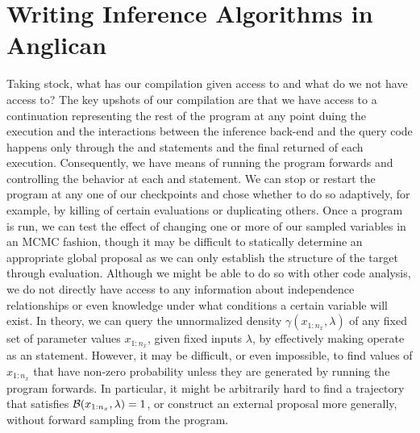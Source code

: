 
\section{Writing Inference Algorithms in Anglican}
\label{sec:proginf:inf}

Taking stock, what has our compilation
given access to and what do we not have access to?  The key upshots of our compilation are
that we have access to a continuation representing the rest of the program at any point
duing the execution and 
the interactions between the inference back-end and the query code happens only through
the \sample and \observe statements and the final returned \angstate of each execution.
Consequently, we have means of running the program
forwards and controlling the behavior at each \sample and \observe statement.  We can
stop or restart the program at any one of our checkpoints and chose whether to do so
adaptively, for example, by killing of certain evaluations or duplicating others.  Once
a program is run, we can test the effect of changing one or more of our sampled variables
in an MCMC fashion, though it may be difficult to statically determine an appropriate global proposal
as we can only establish the structure of the target through evaluation.  Although we might be
able to do so with other code analysis, we do not directly have access to any information
about independence relationships or even knowledge under what conditions a certain
variable will exist.  
In theory, we can query the unnormalized density $\gamma(x_{1:n_x},\lambda)$ of any fixed set of 
parameter values $x_{1:n_x}$, given fixed inputs $\lambda$, by effectively making
\sample operate as an \observe statement.  However, it may be difficult, or even impossible, to find
values of $x_{1:n_x}$ that have non-zero probability unless they are generated by running
the program forwards.  In particular, it might be arbitrarily hard to find a trajectory that satisfies
$\mathcal{B}(x_{1:n_x},\lambda)=1$, or construct an external proposal more generally,
 without forward sampling from the program.  

